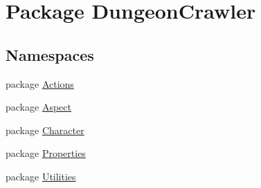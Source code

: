 \hypertarget{namespace_dungeon_crawler}{}\section{Package Dungeon\+Crawler}
\label{namespace_dungeon_crawler}
\subsection*{Namespaces}
\begin{DoxyCompactItemize}
\item 
package \hyperlink{namespace_dungeon_crawler_1_1_actions}{Actions}
\item 
package \hyperlink{namespace_dungeon_crawler_1_1_aspect}{Aspect}
\item 
package \hyperlink{namespace_dungeon_crawler_1_1_character}{Character}
\item 
package \hyperlink{namespace_dungeon_crawler_1_1_properties}{Properties}
\item 
package \hyperlink{namespace_dungeon_crawler_1_1_utilities}{Utilities}
\end{DoxyCompactItemize}
